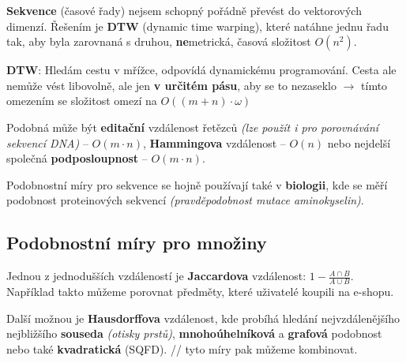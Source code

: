 \textbf{Sekvence} (časové řady) nejsem schopný pořádně převést do vektorových dimenzí. Řešením je \textbf{DTW} (dynamic time warping), které natáhne jednu řadu tak, aby byla zarovnaná s druhou, \textbf{ne}metrická, časová složitost $O(n^2)$.

\textbf{DTW}: Hledám cestu v mřížce, odpovídá dynamickému programování. Cesta ale nemůže vést libovolně, ale jen \textbf{v určitém pásu}, aby se to nezaseklo $\to$ tímto omezením se složitost omezí na $O((m+n) \cdot \omega)$  

Podobná může být \textbf{editační} vzdálenost řetězců \textit{(lze použít i pro porovnávání sekvencí DNA)} -- $O(m\cdot{}n)$, \textbf{Hammingova} vzdálenost -- $O(n)$ nebo nejdelší společná \textbf{podposloupnost} -- $O(m \cdot n)$.

Podobnostní míry pro sekvence se hojně používají také v \textbf{biologii}, kde se měří podobnost proteinových sekvencí \textit{(pravděpodobnost mutace aminokyselin)}.

\subsection{Podobnostní míry pro množiny}

Jednou z jednodušších vzdáleností je \textbf{Jaccardova} vzdálenost: $1 - \frac{A \cap B}{A \cup B}$. Například takto můžeme porovnat předměty, které uživatelé koupili na e-shopu.

Další možnou je \textbf{Hausdorffova} vzdálenost, kde probíhá hledání nejvzdále\-nějšího nejbližšího \textbf{souseda} \textit{(otisky prstů)}, \textbf{mnohoúhelníková} a \textbf{grafová} podo\-bnost nebo také \textbf{kvadratická} (SQFD). // tyto míry pak můžeme kombinovat.
